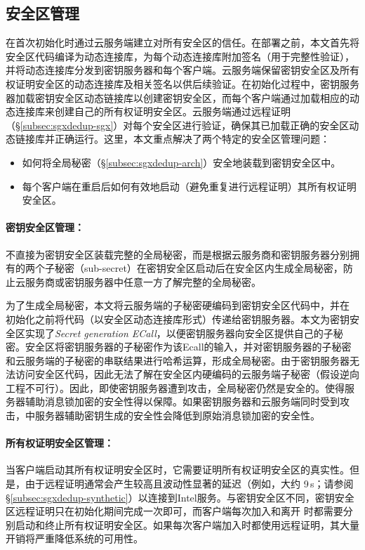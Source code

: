 \subsection{安全区管理}
\label{subsec:sgxdedup-enclave-management}

\sysnameS 在首次初始化时通过云服务端建立对所有安全区的信任。在\sysnameS 部署之前，本文首先将安全区代码编译为动态连接库\cite{sgx}，为每个动态连接库附加签名（用于完整性验证），并将动态连接库分发到密钥服务器和每个客户端。云服务端保留密钥安全区及所有权证明安全区的动态连接库及相关签名以供后续验证。在初始化过程中，密钥服务器加载密钥安全区动态链接库以创建密钥安全区，而每个客户端通过加载相应的动态连接库来创建自己的所有权证明安全区。云服务端通过远程证明（\S\ref{subsec:sgxdedup-sgx}）对每个安全区进行验证，确保其已加载正确的安全区动态链接库并正确运行。这里，本文重点解决了两个特定的安全区管理问题：

\begin{itemize}
    \item 如何将全局秘密（\S\ref{subsec:sgxdedup-arch}）安全地装载到密钥安全区中。
    \item 每个客户端在重启后如何有效地启动（避免重复进行远程证明）其所有权证明安全区。
\end{itemize}

\paragraph*{密钥安全区管理：}\sysnameS 不直接为密钥安全区装载完整的全局秘密，而是根据云服务商和密钥服务器分别拥有的两个子秘密（sub-secret）在密钥安全区启动后在安全区内生成全局秘密，防止云服务商或密钥服务器中任意一方了解完整的全局秘密。

为了生成全局秘密，本文将云服务端的子秘密硬编码到密钥安全区代码中，并在 \sysnameS 初始化之前将代码（以安全区动态连接库形式）传递给密钥服务器。本文为密钥安全区实现了\textit{Secret generation ECall}，以便密钥服务器向安全区提供自己的子秘密。安全区将密钥服务器的子秘密作为该Ecall的输入，并对密钥服务器的子秘密和云服务端的子秘密的串联结果进行哈希运算，形成全局秘密。由于密钥服务器无法访问安全区代码，因此无法了解在安全区内硬编码的云服务端子秘密（假设逆向工程不可行）。因此，即使密钥服务器遭到攻击，全局秘密仍然是安全的。使得服务器辅助消息锁加密的安全性得以保障。如果密钥服务器和云服务端同时受到攻击，\sysnameS 中服务器辅助密钥生成的安全性会降低到原始消息锁加密的安全性。

\paragraph*{所有权证明安全区管理：} 当客户端启动其所有权证明安全区时，它​​需要证明所有权证明安全区的真实性。但是，由于远程证明通常会产生较高且波动性显著的延迟（例如，大约 9\,s；请参阅 \S\ref{subsec:sgxdedup-synthetic}）以连接到Intel服务。与密钥安全区不同，密钥安全区远程证明只在初始化期间完成一次即可，而客户端每次加入和离开 \sysnameS 时都需要分别启动和终止所有权证明安全区。如果每次客户端加入时都使用远程证明，其大量开销将严重降低\sysnameS 系统的可用性。

